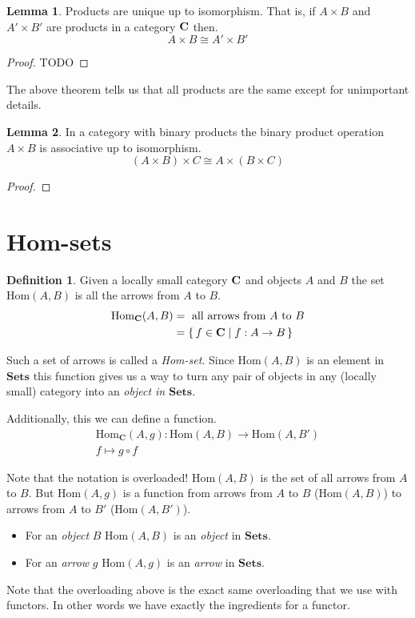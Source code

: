 \documentclass{book}
\theoremstyle{definition}
\newtheorem{definition}{Definition}[section]
\newtheorem{lemma}{Lemma}
\newcommand\Hom{\text{Hom}}
\begin{document}
\begin{lemma}
  Products are unique up to isomorphism. That is, if $A \times B$ and $A' \times
  B'$ are products in a category $\bf{C}$ then.
  $$
  A \times B \cong A' \times B'
  $$
\end{lemma}
\begin{proof}
  TODO
\end{proof}

The above theorem tells us that all products are the same except for unimportant
details.

\begin{lemma}
  In a category with binary products the binary product operation $A \times B$
  is associative up to isomorphism.
  \[
    (A \times B) \times C \cong A \times (B \times C)
  \]
\end{lemma}
\begin{proof}

\end{proof}

\section{Hom-sets}

\begin{definition}
  Given a locally small category $\bf{C}$ and objects $A$ and $B$ the set
  $\Hom(A, B)$ is all the arrows from $A$ to $B$.
  \begin{align*}
    \Hom_{\mathbf{C}}(A, B) &= \text{ all arrows from } A \text{ to } B \\
                          &= \set{ f \in \mathbf{C} \mid f : A \rightarrow B }
  \end{align*}
\end{definition}

Such a set of arrows is called a \emph{Hom-set}. Since $\Hom(A, B)$ is an
element in $\mathbf{Sets}$ this function gives us a way to turn any pair of
objects in any (locally small) category into an \emph{object in
  $\mathbf{Sets}$}.

Additionally, this we can define a function.
\begin{gather*}
  \Hom_{\mathbf{C}}(A, g) : \Hom(A, B) \to \Hom(A, B') \\
  f \mapsto g \circ f
\end{gather*}

Note that the notation is overloaded! $\Hom(A, B)$ is the set of all arrows from
$A$ to $B$. But $\Hom(A, g)$ is a function from arrows from $A$ to $B$
($\Hom(A, B)$) to arrows from $A$ to $B'$ ($\Hom(A, B')$).
\begin{itemize}
\item For an \emph{object} $B$ $\Hom(A, B)$ is an \emph{object} in $\mathbf{Sets}$.
\item For an \emph{arrow} $g$ $\Hom(A, g)$ is an \emph{arrow} in $\mathbf{Sets}$.
\end{itemize}
Note that the overloading above is the exact same overloading that we use with
functors. In other words we have exactly the ingredients for a functor.
\end{document}
